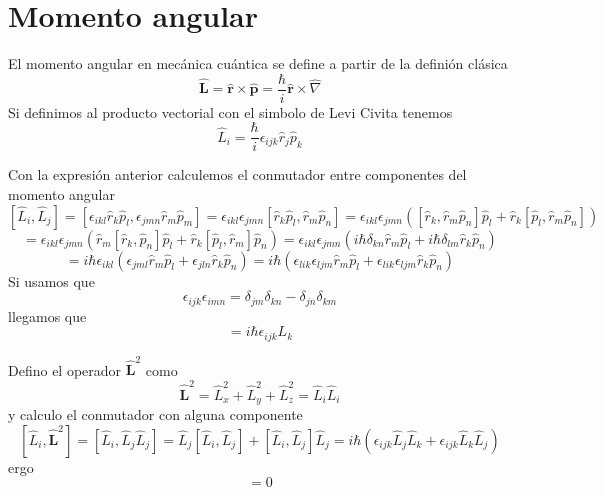 \documentclass{book}
\numberwithin{equation}{section} %
\begin{document}
\section{Momento angular}

El momento angular en mecánica cuántica se define a partir de la definión clásica
\begin{equation}
    \hat{\boldsymbol{L}} = \hat{\boldsymbol{r}} \times \hat{\boldsymbol{p}} = \frac{\hbar}{i} \hat{\boldsymbol{r}} \times \hat{\nabla}
    \label{eq:momento_angular_def}
\end{equation}
Si definimos al producto vectorial con el simbolo de Levi Civita tenemos
\begin{equation}
    \hat{L}_i = \frac{\hbar}{i} \epsilon_{i j k}  \hat{r}_j \hat{p}_k
\end{equation}

Con la expresión anterior calculemos el conmutador entre componentes del momento angular
\[ [\hat{L}_i, \hat{L}_j] = [\epsilon_{i k l} \hat{r}_k \hat{p}_l, \epsilon_{j m n} \hat{r}_m \hat{p}_m] =  \epsilon_{i k l} \epsilon_{j m n} [\hat{r}_k \hat{p}_l, \hat{r}_m \hat{p}_n] = \epsilon_{i k l} \epsilon_{j m n} ([\hat{r}_k,\hat{r}_m \hat{p}_n] \hat{p}_l + \hat{r}_k [\hat{p}_l, \hat{r}_m \hat{p}_n]) \]
\[ = \epsilon_{i k l} \epsilon_{j m n} (\hat{r}_m [\hat{r}_k, \hat{p}_n]        \hat{p}_l + \hat{r}_k [\hat{p}_l, \hat{r}_m] \hat{p}_n) = \epsilon_{i k l} \epsilon_{j m n} (i \hbar \delta_{k n} \hat{r}_m \hat{p}_l + i \hbar \delta_{l m} \hat{r}_k \hat{p}_n) \] 
\[ = i \hbar \epsilon_{i k l} (\epsilon_{j m l} \hat{r}_m \hat{p}_l + \epsilon_{j l n}  \hat{r}_k \hat{p}_n) = i \hbar (\epsilon_{l i k} \epsilon_{l j m} \hat{r}_m \hat{p}_l + \epsilon_{l i k} \epsilon_{l j m} \hat{r}_k \hat{p}_n)\] 
Si usamos que 
\begin{equation}
    \epsilon_{ijk} \epsilon_{imn}=\delta_{j m} \delta_{kn} - \delta_{jn} \delta_{km}
\end{equation}
llegamos que
\begin{equation}
    [\hat{L}_i, \hat{L}_j] = i \hbar \epsilon_{i j k} L_k
\end{equation}


Defino el operador $\hat{\boldsymbol{L}}^2$ como
\begin{equation}
    \hat{\boldsymbol{L}}^2 = \hat{L}^2_x+\hat{L}^2_y+\hat{L}^2_z = \hat{L}_i \hat{L}_i
\end{equation}
y calculo el conmutador con alguna componente
\[ [\hat{L}_i, \hat{\boldsymbol{L}}^2] = [\hat{L}_i, \hat{L}_j \hat{L}_j] = \hat{L}_j [\hat{L}_i, \hat{L}_j] + [\hat{L}_i, \hat{L}_j] \hat{L}_j = i \hbar (\epsilon_{i j k} \hat{L}_j \hat{L}_k + \epsilon_{i j k} \hat{L}_k \hat{L}_j)\]
ergo
\begin{equation}
    [\hat{L}_i, \hat{\boldsymbol{L}}^2] = 0
\end{equation}
\end{document}
